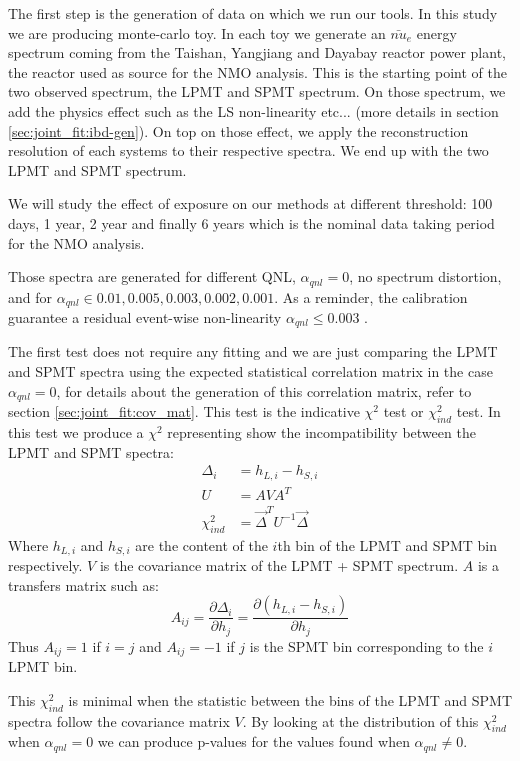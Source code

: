 \documentclass[../main.tex]{subfiles}
\begin{document}
The first step is the generation of data on which we run our tools. In this study we are producing monte-carlo toy. In each toy we generate an $\bar{nu}_e$ energy spectrum coming from the Taishan, Yangjiang and Dayabay reactor power plant, the reactor used as source for the NMO analysis. This is the starting point of the two observed spectrum, the LPMT and SPMT spectrum. On those spectrum, we add the physics effect such as the LS non-linearity etc... (more details in section \ref{sec:joint_fit:ibd-gen}). On top on those effect, we apply the reconstruction resolution of each systems to their respective spectra. We end up with the two LPMT and SPMT spectrum.

We will study the effect of exposure on our methods at different threshold: 100 days, 1 year, 2 year and finally 6 years which is the nominal data taking period for the NMO analysis.

Those spectra are generated for different QNL, $\alpha_{qnl} = 0$, no spectrum distortion, and for $\alpha_{qnl} \in {0.01, 0.005, 0.003, 0.002, 0.001}$. As a reminder, the calibration guarantee a residual event-wise non-linearity $\alpha_{qnl} \leq 0.003$ \cite{juno_collaboration_calibration_2021}.

The first test does not require any fitting and we are just comparing the LPMT and SPMT spectra using the expected statistical correlation matrix in the case $\alpha_{qnl} = 0$, for details about the generation of this correlation matrix, refer to section \ref{sec:joint_fit:cov_mat}. This test is the indicative $\chi^2$ test or $\chi^2_{ind}$ test. In this test we produce a $\chi^2$ representing show the incompatibility between the LPMT and SPMT spectra:
\begin{align}
  \Delta_i &= h_{L,i} - h_{S,i} \\
  U &= A V A^T \\
  \chi^2_{ind} &= \vec{\Delta}^T U^{-1} \vec{\Delta}
\end{align}
Where $h_{L,i}$ and $h_{S,i}$ are the content of the $i$th bin of the LPMT and SPMT bin respectively. $V$ is the covariance matrix of the LPMT + SPMT spectrum. $A$ is a transfers matrix such as:
\begin{equation}
  A_{ij} = \frac{\partial \Delta_i}{\partial h_j} = \frac{\partial(h_{L, i} - h_{S, i})}{\partial h_j}
\end{equation}
Thus $A_{ij} = 1$ if $i = j$ and $A_{ij} = -1$ if $j$ is the SPMT bin corresponding to the $i$ LPMT bin.

This $\chi^2_{ind}$ is minimal when the statistic between the bins of the LPMT and SPMT spectra follow the covariance matrix $V$. By looking at the distribution of this $\chi^2_{ind}$ when $\alpha_{qnl} = 0$ we can produce p-values for the values found when $\alpha_{qnl} \neq 0$.
\end{document}
